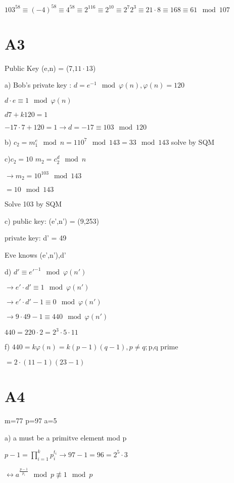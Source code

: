 \documentclass[a4paper]{article}
\begin{document}
$103^{58} \equiv (-4)^{58} \equiv 4^{58} \equiv 2^{116} \equiv 2^{10} \equiv 2^7 2^3 \equiv 21\cdot8 \equiv 168 \equiv 61 \mod 107$

\section{A3} 

Public Key (e,n) = (7,$11\cdot13$)

a) Bob's private key : $d=e^{-1} \mod \varphi(n),\varphi(n)=120$

$d\cdot e \equiv 1 \mod \varphi(n)$

$d7+k120=1$

$-17\cdot 7 + 120 = 1 \rightarrow d= -17 \equiv 103 \mod 120$

b) $c_2 = m_1^e \mod n = 110^7 \mod 143 = 33 \mod 143 $
solve by SQM

c)$c_2 = 10$ $ m_2=c_2^d \mod n$

$\rightarrow m_2=10^{103} \mod 143$

$=10 \mod 143$

Solve 103 by SQM

c) public key: (e',n') = (9,253)

private key: d' = 49

Eve knows (e',n'),d'

d) $d'\equiv e'^{-1} \mod \varphi(n')$

$\rightarrow e'\cdot d' \equiv 1 \mod \varphi(n')$

$\rightarrow e'\cdot d' -1 \equiv 0 \mod \varphi(n')$

$\rightarrow 9\cdot49 -1 \equiv 440 \mod \varphi(n')$

$440=220\cdot2=2^3 \cdot 5 \cdot 11$

f) $440 = k \varphi(n) = k(p-1)(q-1), p \neq q;$p,q prime

$=2\cdot(11-1)(23-1)$



\section{A4} 

m=77
p=97
a=5

a) 
a must be a primitve element mod p %

$p-1 = \displaystyle \prod_{i=1}^k p_i^{t_i} \rightarrow 97-1 = 96 = 2^5 \cdot 3$

$\leftrightarrow a^{\frac{p-1}{p_i}}\mod p  \nequiv 1 \mod p$
\end{document}
